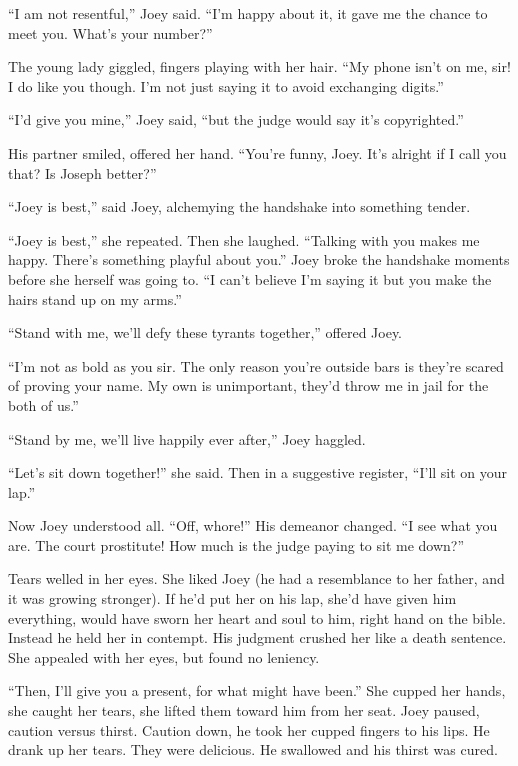 \documentclass[oneside]{book}
\begin{document}
``I am not resentful,'' Joey said.  ``I'm happy about it, it gave me the chance
to meet you.  What's your number?''

The young lady giggled, fingers playing with her hair.  ``My phone isn't on me, sir!
I do like you though.  I'm not just saying it to avoid exchanging digits.''

``I'd give you mine,'' Joey said, ``but the judge would say it's copyrighted.''

His partner smiled, offered her hand.  ``You're funny, Joey.  It's alright if I call you that?
Is Joseph better?''

``Joey is best,'' said Joey, alchemying the handshake into something tender.

``Joey is best,'' she repeated.  Then she laughed.  ``Talking with you makes me happy.
There's something playful about you.''   Joey broke the handshake moments before
she herself was going to.  ``I can't believe I'm saying it but you make the hairs stand up on
my arms.''

``Stand with me, we'll defy these tyrants together,'' offered Joey.

``I'm not as bold as you sir.  The only reason you're outside bars
is they're scared of proving your name.  My own is unimportant, they'd throw me in
jail for the both of us.''

``Stand by me, we'll live happily ever after,'' Joey haggled.

``Let's sit down together!'' she said.
Then in a suggestive register, ``I'll sit on your lap.''

Now Joey understood all.
``Off, whore!''  His demeanor changed.  ``I see what you are.
The court prostitute!  How much is the judge paying to sit me down?''

Tears welled in her eyes.
She liked Joey (he had a resemblance to her father, and it was growing stronger).
If he'd put her on his lap,
she'd have given him everything, would have sworn
her heart and soul to him, right hand on the bible.
Instead he held her in contempt.
His judgment crushed her like a death sentence.
She appealed with her eyes, but found no leniency.

``Then, I'll give you a present, for what might have been.''
She cupped her hands, she caught her tears, she lifted them toward him
from her seat.  Joey paused, caution versus thirst.
Caution down, he took her cupped fingers to his lips.
He drank up her tears.  They were delicious.  He swallowed and his thirst was cured.
\end{document}
